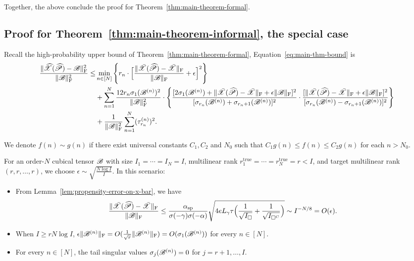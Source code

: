 \documentclass{article}
\newcommand{\T}[2][]{#1\mathscr{\MakeUppercase{#2}}}
\newcommand{\norm}[1]{\Vert #1 \Vert}
\newcommand{\fnorm}[1]{\norm{#1}_{\mathrm{F}}}
\def\Ph{\widehat P}
\theoremstyle{plain}
\begin{document}
Together, the above conclude the proof for Theorem~\ref{thm:main-theorem-formal}.

\subsection{Proof for Theorem~\ref{thm:main-theorem-informal}, the special case}

Recall the high-probability upper bound of Theorem~\ref{thm:main-theorem-formal}, Equation~\ref{eq:main-thm-bound} is
\begin{equation}
	\begin{aligned}
		\frac{\fnorm{\widehat{\T{X}}(\widehat{\T{P}}) - \T{B}}^2}{\fnorm{\T{B}}^2} \leq & \min_{n \in [N]} \Bigg\{r_n \cdot \Big[\frac{\fnorm{\bar{\T{X}}(\T{\Ph}) - \bar{\T{X}}}}{\fnorm{\T{B}}} + \epsilon \Big]^2 \Bigg\} \\
		& + \sum_{n=1}^N \frac{12 r_n \sigma_1 (\T{B}^{(n)})^2}{\fnorm{\T{B}}^2}  \cdot \Bigg\{\frac{[2 \sigma_1 (\T{B}^{(n)}) + \fnorm{\bar{\T{X}}(\T{\Ph}) - \bar{\T{X}}} + \epsilon \fnorm{\T{B}}]^2}{[\sigma_{r_n} (\T{B}^{(n)}) + \sigma_{r_n+1} (\T{B}^{(n)})]^2} \cdot \frac{[\fnorm{\bar{\T{X}}(\T{\Ph}) - \bar{\T{X}}} + \epsilon \fnorm{\T{B}}]^2}{[\sigma_{r_n} (\T{B}^{(n)}) - \sigma_{r_n+1} (\T{B}^{(n)})]^2} \Bigg\}\\
		& + \frac{1}{\fnorm{\T{B}}^2} \sum_{n=1}^{N} (\tau_{r_n}^{(n)})^2. \\
	\end{aligned}
	\nonumber
\end{equation}

We denote $f(n) \sim g(n)$ if there exist universal constants $C_1, C_2$ and $N_0$ such that $C_1 g(n) \leq f(n) \leq C_2 g(n)$ for each $n > N_0$.

For an order-$N$ cubical tensor $\T{B}$ with size $I_1 = \cdots = I_N = I$, multilinear rank $r_1^\mathrm{true} = \cdots = r_N^\mathrm{true} = r < I$, and target multilinear rank $(r, r, \ldots, r)$, we choose $\epsilon \sim \sqrt{\frac{N \log I}{I}}$.
In this scenario:
\begin{itemize}
	\item From Lemma~\ref{lem:propensity-error-on-x-bar}, we have
	\begin{equation}
		\frac{\fnorm{\bar{\T{X}}(\T{\Ph}) - \bar{\T{X}}}}{\fnorm{\T{B}}} \leq \frac{\alpha_\mathrm{sp}}{\sigma(-\gamma) \sigma(-\alpha)} \sqrt{4 e L_\gamma \tau \Big(\frac{1}{\sqrt{I_\square}}+\frac{1}{\sqrt{I_{\square^C}}}\Big)} \sim I^{-N/8} = O(\epsilon).
		\nonumber
	\end{equation}
	\item When $I \geq r N \log I$, $\epsilon \fnorm{\T{B}^{(n)}} = O(\frac{1}{\sqrt{r}} \fnorm{\T{B}^{(n)}}) = O(\sigma_1 (\T{B}^{(n)}))$ for every $n \in [N]$. 
	\item For every $n \in [N]$, the tail singular values $\sigma_j (\T{B}^{(n)}) = 0$ for $j = r+1, \ldots, I$.
\end{itemize}
\end{document}

